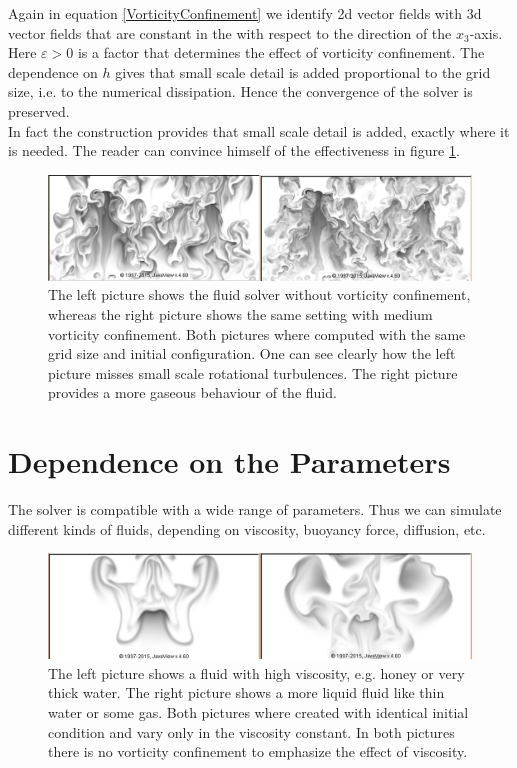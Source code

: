 \documentclass[a4paper,10pt,oneside,final,german,openbib,pdftex,titlepage]{scrbook}
\begin{document}
Again in equation \ref{VorticityConfinement} we identify 2d vector fields with 3d vector fields that are constant in the with respect to the direction of the $x_3$-axis.
Here $\varepsilon >0$ is a factor that determines the effect of vorticity confinement. The dependence on $h$ gives that small scale detail is added proportional to the grid size, i.e. to the numerical dissipation. Hence the convergence of the solver is preserved.\\
In fact the construction provides that small scale detail is added, exactly where it is needed. The reader can convince himself of the effectiveness in figure \ref{VorticityOnOff}.

\begin{figure}[H]
 \centering
 \includegraphics[scale=0.30]{images/Vorticity.png}
 \caption{The left picture shows the fluid solver without vorticity confinement, whereas the right picture shows the same setting with medium vorticity confinement. Both pictures where computed with the same grid size and initial configuration. One can see clearly how the left picture misses small scale rotational turbulences. The right picture provides a more gaseous behaviour of the fluid.}
 \label{VorticityOnOff}
\end{figure}

\section{Dependence on the Parameters}
The solver is compatible with a wide range of parameters. Thus we can simulate different kinds of fluids, depending on viscosity, buoyancy force, diffusion, etc.

\begin{figure}[H]
 \centering
 \includegraphics[scale=0.30]{images/Viscosity-2.png}
 \caption{The left picture shows a fluid with high viscosity, e.g. honey or very thick water. The right picture shows a more liquid fluid like thin water or some gas. Both pictures where created with identical initial condition and vary only in the viscosity constant. In both pictures there is no vorticity confinement to emphasize the effect of viscosity.}
 \label{ViscosityOnOff}
\end{figure}
\end{document}
